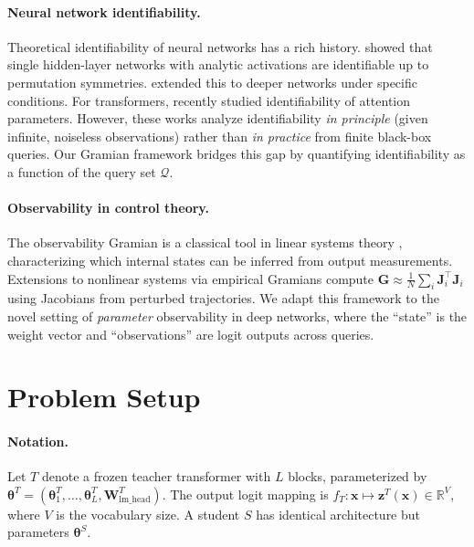 \documentclass{article}
\newcommand{\R}{\mathbb{R}}
\newcommand{\cQ}{\mathcal{Q}}
\newcommand{\btheta}{\boldsymbol{\theta}}
\newcommand{\bz}{\mathbf{z}}
\newcommand{\bx}{\mathbf{x}}
\newcommand{\bW}{\mathbf{W}}
\newcommand{\bJ}{\mathbf{J}}
\newcommand{\bG}{\mathbf{G}}
\begin{document}
\paragraph{Neural network identifiability.}
Theoretical identifiability of neural networks has a rich history. \citet{sussmann1992uniqueness} showed that single hidden-layer networks with analytic activations are identifiable up to permutation symmetries. \citet{bui2020functional} extended this to deeper networks under specific conditions. For transformers, \citet{liu2025identifiability} recently studied identifiability of attention parameters. However, these works analyze identifiability \emph{in principle} (given infinite, noiseless observations) rather than \emph{in practice} from finite black-box queries. Our Gramian framework bridges this gap by quantifying identifiability as a function of the query set $\cQ$.

\paragraph{Observability in control theory.}
The observability Gramian is a classical tool in linear systems theory \citep{kailath1980linear}, characterizing which internal states can be inferred from output measurements. Extensions to nonlinear systems via empirical Gramians \citep{lall2002subspace} compute $\bG \approx \frac{1}{N}\sum_i \bJ_i^\top \bJ_i$ using Jacobians from perturbed trajectories. We adapt this framework to the novel setting of \emph{parameter} observability in deep networks, where the ``state'' is the weight vector and ``observations'' are logit outputs across queries.

\section{Problem Setup}
\label{sec:setup}

\paragraph{Notation.}
Let $T$ denote a frozen teacher transformer with $L$ blocks, parameterized by $\btheta^T = (\btheta^T_1, \ldots, \btheta^T_L, \bW_{\text{lm\_head}}^T)$. The output logit mapping is $f_T: \bx \mapsto \bz^T(\bx) \in \R^{V}$, where $V$ is the vocabulary size. A student $S$ has identical architecture but parameters $\btheta^S$.
\end{document}
